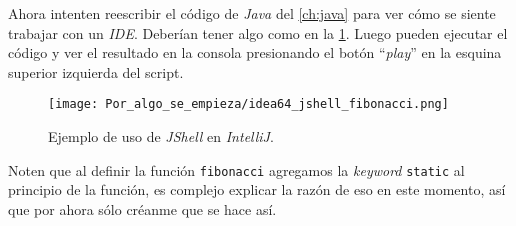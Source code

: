    Ahora intenten reescribir el código de \textit{Java} del \cref{ch:java} para ver cómo se 
    siente trabajar con un \textit{IDE}.
    Deberían tener algo como en la \cref{fig:idea64-jshell-fibonacci}.
    Luego pueden ejecutar el código y ver el resultado en la consola presionando el botón 
    \enquote{\textit{play}} en la esquina superior izquierda del script.

    \begin{figure}[ht!]
      \centering
      \texttt{[image: Por\_algo\_se\_empieza/idea64\_jshell\_fibonacci.png]}
      \caption{Ejemplo de uso de \textit{JShell} en \textit{IntelliJ}.}
      \label{fig:idea64-jshell-fibonacci}
    \end{figure}

    Noten que al definir la función \texttt{fibonacci} agregamos la \textit{keyword}
    \texttt{static} al principio de la función, es complejo explicar la razón de eso en este
    momento, así que por ahora sólo créanme que se hace así.
